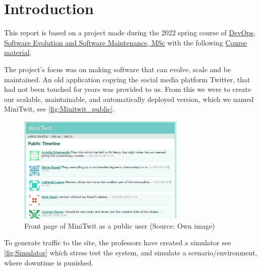 \section{Introduction}
This report is based on a project made during the 2022 spring course of \href{https://learnit.itu.dk/local/coursebase/view.php?ciid=909}{DevOps, Software Evolution and Software Maintenance, MSc} with the following  \href{https://github.com/itu-devops/lecture_notes/tree/e44664f50c8b0ffb30a77a29e305df3f6750d5d4}{Course material}. 

The project's focus was on making software that can evolve, scale and be maintained. An old application copying the social media platform Twitter, that had not been touched for years was provided to us. From this we were to create our scalable, maintainable, and automatically deployed version, which we named MiniTwit, see \autoref{fig:Minitwit_public}.

\begin{figure}[!ht]
    \centering
    \captionsetup{justification=centering,margin=1cm}
    \includegraphics[width=80mm]{images/introduction/minitwitFrontPage.png}
    \caption{Front page of MiniTwit as a public user (Source: Own image)}
    \label{fig:Minitwit_public}
\end{figure}

To generate traffic to the site, the professors have created a simulator see \autoref{fig:Simulator} which stress test the system, and simulate a scenario/environment, where downtime is punished. 

